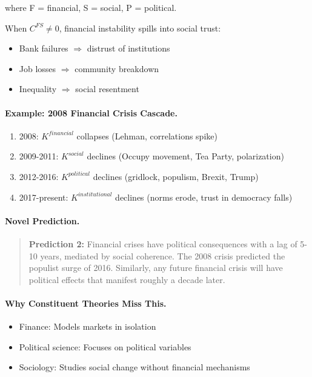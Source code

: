 \documentclass[12pt,a4paper]{article}
\begin{document}
where F = financial, S = social, P = political.

When $C^{FS} \neq 0$, financial instability spills into social trust:
\begin{itemize}
  \item Bank failures $\Rightarrow$ distrust of institutions
  \item Job losses $\Rightarrow$ community breakdown
  \item Inequality $\Rightarrow$ social resentment
\end{itemize}

\paragraph{Example: 2008 Financial Crisis Cascade.}
\begin{enumerate}
  \item 2008: $K^{financial}$ collapses (Lehman, correlations spike)
  \item 2009-2011: $K^{social}$ declines (Occupy movement, Tea Party, polarization)
  \item 2012-2016: $K^{political}$ declines (gridlock, populism, Brexit, Trump)
  \item 2017-present: $K^{institutional}$ declines (norms erode, trust in democracy falls)
\end{enumerate}

\paragraph{Novel Prediction.}
\begin{quote}
\textbf{Prediction 2:} Financial crises have political consequences
with a lag of 5-10 years, mediated by social coherence.
The 2008 crisis predicted the populist surge of 2016.
Similarly, any future financial crisis will have political effects
that manifest roughly a decade later.
\end{quote}

\paragraph{Why Constituent Theories Miss This.}
\begin{itemize}
  \item Finance: Models markets in isolation
  \item Political science: Focuses on political variables
  \item Sociology: Studies social change without financial mechanisms
\end{itemize}
\end{document}
